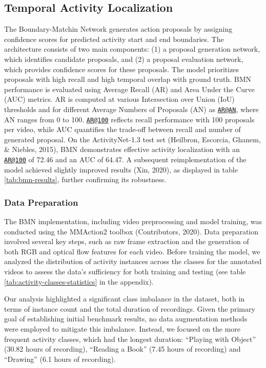 \documentclass[
  man,floatsintext]{apa6}
\begin{document}
\subsection{Temporal Activity Localization}\label{temporal-activity-localization}

The Boundary-Matchin Network generates action proposals by assigning confidence scores for predicted activity start and end boundaries. The architecture consists of two main components: (1) a proposal generation network, which identifies candidate proposals, and (2) a proposal evaluation network, which provides confidence scores for these proposals. The model prioritizes proposals with high recall and high temporal overlap with ground truth.
BMN performance is evaluated using Average Recall (AR) and Area Under the Curve (AUC) metrics. AR is computed at various Intersection over Union (IoU) thresholds and for different Average Numbers of Proposals (AN) as \href{mailto:AR@AN}{\nolinkurl{AR@AN}}, where AN ranges from 0 to 100. \href{mailto:AR@100}{\nolinkurl{AR@100}} reflects recall performance with 100 proposals per video, while AUC quantifies the trade-off between recall and number of generated proposal. On the ActivityNet-1.3 test set (Heilbron, Escorcia, Ghanem, \& Niebles, 2015), BMN demonstrates effective activity localization with an \href{mailto:AR@100}{\nolinkurl{AR@100}} of 72.46 and an AUC of 64.47. A subsequent reimplementation of the model achieved slightly improved results (Xin, 2020), as displayed in table \ref{tab:bmn-results}, further confirming its robustness.

\subsubsection{Data Preparation}\label{data-preparation}

The BMN implementation, including video preprocessing and model training, was conducted using the MMAction2 toolbox (Contributors, 2020). Data preparation involved several key steps, such as raw frame extraction and the generation of both RGB and optical flow features for each video. Before training the model, we analyzed the distribution of activity instances across the classes for the annotated videos to assess the data's sufficiency for both training and testing (see table \ref{tab:activity-classes-statistics} in the appendix).

Our analysis highlighted a significant class imbalance in the dataset, both in terms of instance count and the total duration of recordings. Given the primary goal of establishing initial benchmark results, no data augmentation methods were employed to mitigate this imbalance. Instead, we focused on the more frequent activity classes, which had the longest duration: ``Playing with Object'' (30.82 hours of recording), ``Reading a Book'' (7.45 hours of recording) and ``Drawing'' (6.1 hours of recording).
\end{document}
